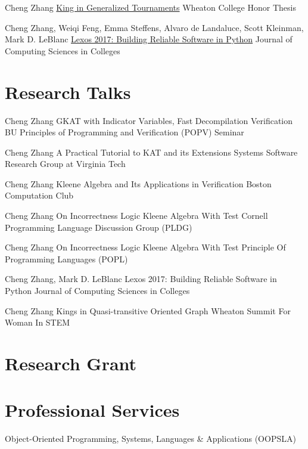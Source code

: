 \documentclass[10pt]{moderncv}        %
\let\oldsection=\section
\renewcommand{\section}{%
  \needspace{\baselineskip}
  \oldsection
}
\begin{document}
{Cheng Zhang}
{\href{http://hdl.handle.net/11040/24570}{King in Generalized Tournaments}}
{Wheaton College Honor Thesis}
{}{}

{Cheng Zhang, Weiqi Feng, Emma Steffens, Alvaro de Landaluce, Scott Kleinman, Mark D. LeBlanc}
{\href{https://dl.acm.org/doi/10.5555/3205191.3205205}{Lexos 2017: Building Reliable Software in Python}}
{Journal of Computing Sciences in Colleges}
{}{}


\section{Research Talks}

{Cheng Zhang}
{GKAT with Indicator Variables, Fast Decompilation Verification}
{BU Principles of Programming and Verification (POPV) Seminar}
{}{}

{Cheng Zhang}
{A Practical Tutorial to KAT and its Extensions}
{Systems Software Research Group at Virginia Tech}
{}{}

{Cheng Zhang}
{Kleene Algebra and Its Applications in Verification}
{Boston Computation Club}
{}{}

{Cheng Zhang}
{On Incorrectness Logic Kleene Algebra With Test}
{Cornell Programming Language Discussion Group (PLDG)}
{}{}

{Cheng Zhang}
{On Incorrectness Logic Kleene Algebra With Test}
{Principle Of Programming Languages (POPL)}
{}{}

{Cheng Zhang, Mark D. LeBlanc}
{Lexos 2017: Building Reliable Software in Python}
{Journal of Computing Sciences in Colleges}
{}{}

{Cheng Zhang}
{Kings in Quasi-transitive Oriented Graph}
{Wheaton Summit For Woman In STEM}
{}{}

\section{Research Grant}



\section{Professional Services}

{Object-Oriented Programming, Systems, Languages \& Applications (OOPSLA)}{}{}{}
\end{document}
